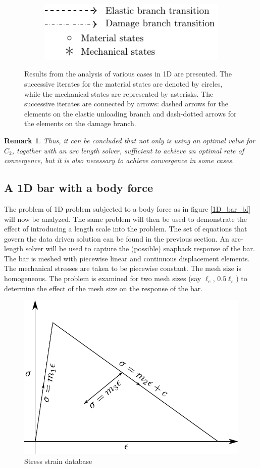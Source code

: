 \documentclass[11pt]{elsarticle}
\newtheorem*{remark}{Remark}
\begin{document}
\begin{figure}
\begin{subfigure}{0.45\textwidth}
		\centering
		\includegraphics[scale=0.9]{./conv_figs/legend.pdf}
	\end{subfigure}
	\caption{Results from the analysis of various cases in 1D are presented. The successive iterates for the material states are denoted by circles, while the mechanical states are represented by asterisks. The successive iterates are connected by arrows: dashed arrows for the elements on the elastic unloading branch and dash-dotted arrows for the elements on the damage branch.}
\end{figure}

\begin{remark}
Thus, it can be concluded that not only is using an optimal value for $C_2$, together with an arc length solver, sufficient to achieve an optimal rate of convergence, but it is also necessary to achieve convergence in some cases.
\end{remark}

\subsection{A 1D bar with a body force}
The problem of 1D problem subjected to a body force as in figure \ref{1D_bar_bf} will now be analyzed. The same problem will then be used to demonstrate the effect of introducing a length scale into the problem. The set of equations that govern the data driven solution can be found in the previous section. An arc-length solver will be used to capture the (possible) snapback response of the bar. The bar is meshed with piecewise linear and continuous displacement elements. The mechanical stresses are taken to be piecewise constant. The mesh size is homogeneous. The problem is examined for two mesh sizes (say $\ell_e$, $0.5 \ell_e$) to determine the effect of the mesh size on the response of the bar.

\begin{figure}
	\centering
	\includegraphics[width=0.4\linewidth]{Images/database_actual.pdf}
	\caption{Stress strain database \label{database_actual}}
\end{figure}
\end{document}
